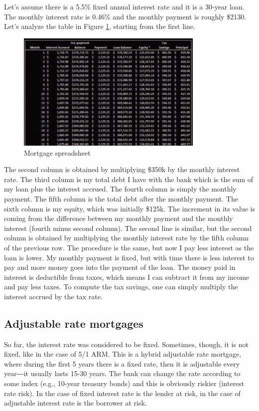 Let's assume there is a 5.5\% fixed annual interest rate and it is a 30-year loan. The monthly interest rate is 0.46\% and the monthly payment is roughly \$2130. Let's analyze the table in Figure \ref{fig:mortgage_xlsx}, starting from the first line. 

\begin{figure}[h!]
\centering
\includegraphics[width=0.8\textwidth]{images/mortgage_xlsx.png}
\caption{Mortgage spreadsheet}
\label{fig:mortgage_xlsx}
\end{figure}

The second column is obtained by multiplying \$350k by the monthly interest rate. The third column is my total debt I have with the bank which is the sum of my loan plus the interest accrued. The fourth column is simply the monthly payment. The fifth column is the total debt after the monthly payment. The sixth column is my equity, which was initially \$125k. The increment in its value is coming from the difference between my monthly payment and the monthly interest (fourth minus second column). The second line is similar, but the second column is obtained by multiplying the monthly interest rate by the fifth column of the previous row. The procedure is the same, but now I pay less interest as the loan is lower. My monthly payment is fixed, but with time there is less interest to pay and more money goes into the payment of the loan. The money paid in interest is deductible from taxes, which means I can subtract it from my income and pay less taxes. To compute the tax savings, one can simply multiply the interest accrued by the tax rate. 

\subsection{Adjustable rate mortgages}
So far, the interest rate was considered to be fixed. Sometimes, though, it is not fixed, like in the case of 5/1 ARM. This is a hybrid adjustable rate mortgage, where during the first 5 years there is a fixed rate, then it is adjustable every year―it usually lasts 15-30 years. The bank can change the rate according to some index (e.g., 10-year treasury bonds) and this is obviously riskier (interest rate risk). In the case of fixed interest rate is the lender at risk, in the case of adjustable interest rate is the borrower at risk.
